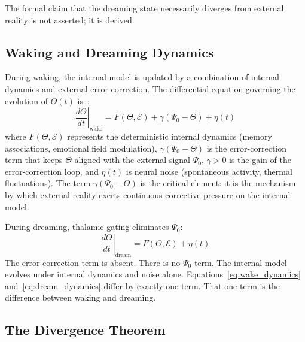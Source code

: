 The formal claim that the dreaming state necessarily diverges from external reality is not asserted; it is derived.

\subsection{Waking and Dreaming Dynamics}

During waking, the internal model is updated by a combination of internal dynamics and external error correction. The differential equation governing the evolution of $\Theta(t)$ is~\cite{author_dream}:
%
\begin{equation}
\left.\frac{d\Theta}{dt}\right|_{\mathrm{wake}} = F(\Theta, \mathcal{E}) + \gamma(\Psi_0 - \Theta) + \eta(t)
\label{eq:wake_dynamics}
\end{equation}
%
where $F(\Theta, \mathcal{E})$ represents the deterministic internal dynamics (memory associations, emotional field modulation), $\gamma(\Psi_0 - \Theta)$ is the error-correction term that keeps $\Theta$ aligned with the external signal $\Psi_0$, $\gamma > 0$ is the gain of the error-correction loop, and $\eta(t)$ is neural noise (spontaneous activity, thermal fluctuations). The term $\gamma(\Psi_0 - \Theta)$ is the critical element: it is the mechanism by which external reality exerts continuous corrective pressure on the internal model.

During dreaming, thalamic gating eliminates $\Psi_0$:
%
\begin{equation}
\left.\frac{d\Theta}{dt}\right|_{\mathrm{dream}} = F(\Theta, \mathcal{E}) + \eta(t)
\label{eq:dream_dynamics}
\end{equation}
%
The error-correction term is absent. There is no $\Psi_0$ term. The internal model evolves under internal dynamics and noise alone. Equations~\eqref{eq:wake_dynamics} and~\eqref{eq:dream_dynamics} differ by exactly one term. That one term is the difference between waking and dreaming.

\subsection{The Divergence Theorem}

